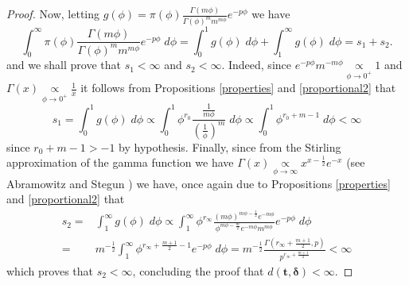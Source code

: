 \documentclass[]{interact}
\theoremstyle{plain}%
\theoremstyle{definition}
\theoremstyle{remark}
\begin{document}
\begin{appendix}
\begin{proof}
Now, letting $g(\phi)=\pi(\phi)\frac{\Gamma(m\phi)}{\Gamma(\phi)^m m^{m \phi}}e^{-p\phi}$ we have
\begin{equation*} \int_{0}^{\infty}\pi(\phi)\frac{\Gamma(m\phi)}{\Gamma(\phi)^m m^{m \phi}}e^{-p\phi}\; d\phi =  \int_{0}^1g(\phi)\; d\phi + \int_1^\infty g(\phi)\; d\phi = s_1+s_2.
\end{equation*}
and we shall prove that $s_1<\infty$ and $s_2<\infty$. Indeed, since
 $e^{-p\phi}m^{-m\phi}\underset{\phi\to 0^+}{\propto}1$ and $\Gamma(x)\underset{\phi\to 0^+}{\propto} \frac{1}{x}$ it follows from Propositions \ref{properties} and \ref{proportional2} that
 \begin{equation*} s_1=\int_{0}^1 g(\phi)\; d\phi \propto \int_0^1 \phi^{r_0}\frac{\frac{1}{m\phi}}{\left(\frac{1}{\phi}\right)^m}\; d\phi \propto \int_0^1 \phi^{r_0+m-1}\; d\phi < \infty
 \end{equation*}
since $r_0+m-1>-1$ by hypothesis. Finally, since from the Stirling approximation of the gamma function we have $\Gamma(x)\underset{\phi\to \infty}{\propto} x^{x-\frac{1}{2}}e^{-x}$ (see Abramowitz and Stegun \cite{abramowitz}) we have, once again due to Propositions \ref{properties} and \ref{proportional2} that
\begin{equation*}
\begin{aligned}
s_2 = &\int_1^\infty g(\phi)\; d\phi \propto \int_{1}^{\infty}\phi^{r_\infty}\frac{(m\phi)^{m\phi-\frac{1}{2}}e^{-m\phi}}{\phi^{m\phi-\frac{m}{2}}e^{-m\phi} m^{m \phi}}e^{-p\phi}\; d\phi\\ =& m^{-\frac{1}{2}} \int_1^\infty \phi^{r_\infty+\frac{m+1}{2}-1}e^{-p\phi}\; d\phi = m^{-\frac{1}{2}}\frac{\Gamma\left(r_\infty+\frac{m+1}{2},p\right)}{p^{r_\infty+\frac{m+1}{2}}}<\infty
\end{aligned}
\end{equation*}
which proves that $s_2<\infty$, concluding the proof that $d(\boldsymbol{t,\delta})<\infty$.
\end{proof}

\end{appendix}



\end{document}
